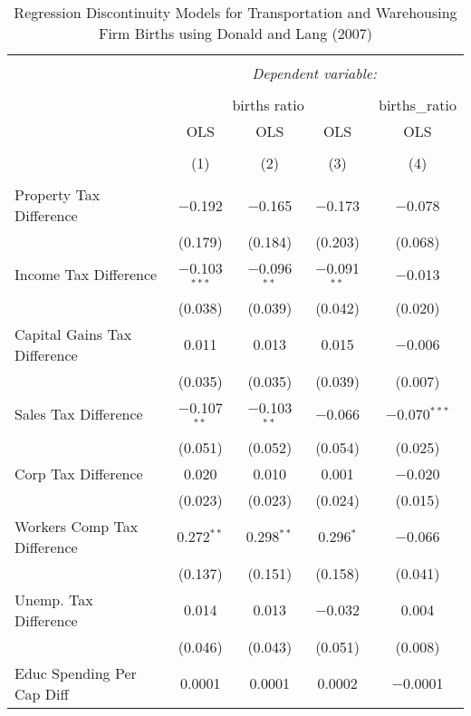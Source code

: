 
\begin{table}[!htbp] \centering 
  \caption{Regression Discontinuity Models for  Transportation and Warehousing Firm Births using Donald and Lang (2007)} 
  \label{} 
\begin{tabular}{@{\extracolsep{5pt}}lcccc} 
\\[-1.8ex]\hline 
\hline \\[-1.8ex] 
 & \multicolumn{4}{c}{\textit{Dependent variable:}} \\ 
\cline{2-5} 
\\[-1.8ex] & \multicolumn{3}{c}{births ratio} & births\_ratio \\ 
 & OLS & OLS & OLS & OLS \\ 
\\[-1.8ex] & (1) & (2) & (3) & (4)\\ 
\hline \\[-1.8ex] 
 Property Tax Difference & $-$0.192 & $-$0.165 & $-$0.173 & $-$0.078 \\ 
  & (0.179) & (0.184) & (0.203) & (0.068) \\ 
  Income Tax Difference & $-$0.103$^{***}$ & $-$0.096$^{**}$ & $-$0.091$^{**}$ & $-$0.013 \\ 
  & (0.038) & (0.039) & (0.042) & (0.020) \\ 
  Capital Gains Tax Difference & 0.011 & 0.013 & 0.015 & $-$0.006 \\ 
  & (0.035) & (0.035) & (0.039) & (0.007) \\ 
  Sales Tax Difference & $-$0.107$^{**}$ & $-$0.103$^{**}$ & $-$0.066 & $-$0.070$^{***}$ \\ 
  & (0.051) & (0.052) & (0.054) & (0.025) \\ 
  Corp Tax Difference & 0.020 & 0.010 & 0.001 & $-$0.020 \\ 
  & (0.023) & (0.023) & (0.024) & (0.015) \\ 
  Workers Comp Tax Difference & 0.272$^{**}$ & 0.298$^{**}$ & 0.296$^{*}$ & $-$0.066 \\ 
  & (0.137) & (0.151) & (0.158) & (0.041) \\ 
  Unemp. Tax Difference & 0.014 & 0.013 & $-$0.032 & 0.004 \\ 
  & (0.046) & (0.043) & (0.051) & (0.008) \\ 
  Educ Spending Per Cap Diff & 0.0001 & 0.0001 & 0.0002 & $-$0.0001 \\ 

\end{tabular}
\end{table}
